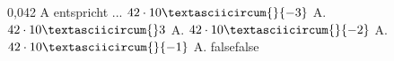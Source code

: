     {0,042 A entspricht ...}
    {$42\cdot 10\textasciicircum{}\{-3\}$ A.}
    {$42\cdot 10\textasciicircum{}3$ A.}
    {$42\cdot 10\textasciicircum{}\{-2\}$ A.}
    {$42\cdot 10\textasciicircum{}\{-1\}$ A.}
    {false}{false}